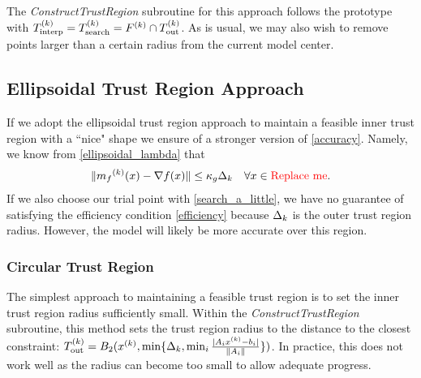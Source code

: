 The \emph{ConstructTrustRegion} subroutine for this approach follows the prototype with ${T_{\text{interp}}^{(k)}} = {T_{\text{search}}^{(k)}} = {F}^{(k)} \cap {T_{\text{out}}^{(k)}} $.
As is usual, we may also wish to remove points larger than a certain radius from the current model center.






\subsection{Ellipsoidal Trust Region Approach}

If we adopt the ellipsoidal trust region approach to maintain a feasible inner trust region with a ``nice" shape we ensure of a stronger version of \cref{accuracy}.
Namely, we know from \cref{ellipsoidal_lambda} that 
\begin{align*}
    \|{{m}_f}^{(k)}(x) - \nabla f(x) \| \le \kappa_g \Delta_{k} \quad \forall x \in \color{red} \text{Replace me} \color{black}.
\end{align*}
If we also choose our trial point with \cref{search_a_little}, we have no guarantee of satisfying the efficiency condition \cref{efficiency} because $\Delta_k$ is the outer trust region radius.
However, the model will likely be more accurate over this region.


\subsubsection{Circular Trust Region}
The simplest approach to maintaining a feasible trust region is to set the inner trust region radius sufficiently small.
Within the \emph{ConstructTrustRegion} subroutine, this method sets the trust region radius to the distance to the closest constraint:
${T_{\text{out}}^{(k)}} = B_2({x^{(k)}}, \min\{\Delta_k, \min_{i}\frac{|A_i{x^{(k)}} - b_i|}{\|A_i\|} \})$.
In practice, this does not work well as the radius can become too small to allow adequate progress.

